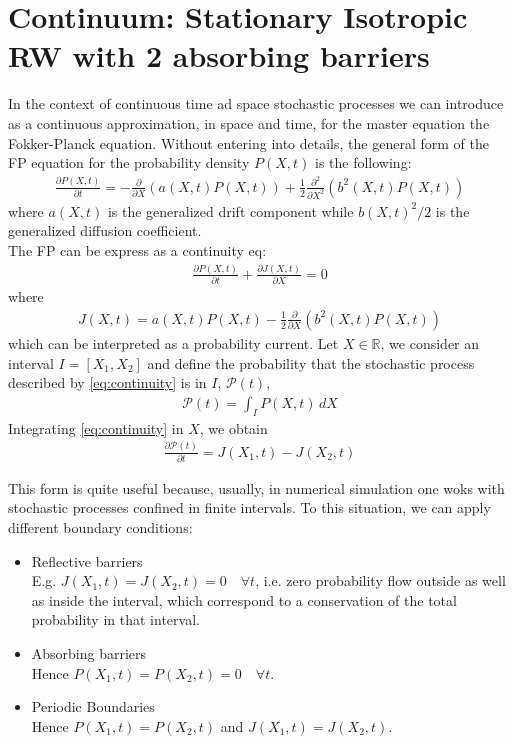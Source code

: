 \documentclass[4apaper,11pt,fleqn]{article}
\theoremstyle{remark}
\theoremstyle{definition}
\begin{document}
\section{Continuum: Stationary Isotropic RW with 2 absorbing barriers}
In the context of continuous time ad space stochastic processes we can introduce as a continuous approximation, in space and time, for the master equation the Fokker-Planck equation.
Without entering into details, the general form of the FP equation for the probability density $P(X,t)$ is the following:
\begin{align*}
  \frac{\partial P(X, t)}{\partial t}=-\frac{\partial}{\partial X}(a(X, t) P(X, t))+\frac{1}{2} \frac{\partial^{2}}{\partial X^{2}}\left(b^{2}(X, t) P(X, t)\right)
\end{align*}
where $a(X,t)$ is the generalized drift component while $b(X,t)^2/2$ is the generalized diffusion coefficient.\\
The FP can be express as a continuity eq:
\begin{align}
  \label{eq:continuity}
  \frac{\partial P(X, t)}{\partial t}+\frac{\partial J(X, t)}{\partial X}=0
\end{align}
where
\begin{align*}
  J(X, t)=a(X, t) P(X, t)-\frac{1}{2} \frac{\partial}{\partial X}\left(b^{2}(X, t) P(X, t)\right)
\end{align*}
which can be interpreted as a probability current.
Let $X \in \mathbb{R}$, we consider an interval $I=[X_1,X_2]$ and define the probability that the stochastic process described by \eqref{eq:continuity} is in $I$, $\mathcal{P}(t)$,
\begin{align*}
  \mathcal{P}(t) = \int_I P(X,t) \, dX
\end{align*}
Integrating \eqref{eq:continuity} in $X$, we obtain
\begin{align*}
  \frac{\partial \mathcal{P}(t)}{\partial t}=J\left(X_{1}, t\right)-J\left(X_{2}, t\right)
\end{align*}

This form is quite useful because, usually, in numerical simulation one woks with stochastic processes confined in finite intervals. To this situation, we can apply different boundary conditions:
\begin{itemize}[leftmargin=*]
  \item Reflective barriers\\
  E.g. $J(X_1,t)=J(X_2,t)=0 \quad \forall t$, i.e. zero probability flow outside as well as inside the interval, which correspond to a conservation of the total probability in that interval.
  \item Absorbing barriers\\
  Hence $P(X_1,t) = P(X_2,t) = 0 \quad \forall t$.
  \item Periodic Boundaries\\
  Hence $P(X_1,t) = P(X_2,t)$ and $J(X_1,t)=J(X_2,t)$.
\end{itemize}
\end{document}
